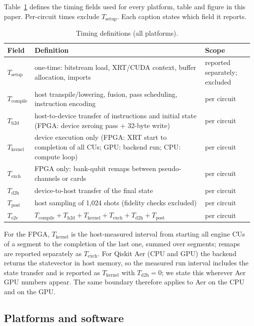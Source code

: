 \documentclass[pdflatex,sn-mathphys-num]{sn-jnl}
\theoremstyle{thmstyleone}
\theoremstyle{thmstylethree}
\begin{document}
Table~\ref{tab:timing} defines the timing fields used for every platform, table and figure in this paper. Per-circuit times exclude $T_\mathrm{setup}$. Each caption states which field it reports.

\begin{table}
\centering
\caption{Timing definitions (all platforms).}\label{tab:timing}
\small
\begin{tabular}{p{1.5cm}p{8.3cm}p{1.8cm}}
\toprule
Field & Definition & Scope \\
\midrule
$T_\mathrm{setup}$ & one-time: bitstream load, XRT/CUDA context, buffer allocation, imports & reported separately; excluded \\
$T_\mathrm{compile}$ & host transpile/lowering, fusion, pass scheduling, instruction encoding & per circuit \\
$T_\mathrm{h2d}$ & host-to-device transfer of instructions and initial state (FPGA: device zeroing pass + 32-byte write) & per circuit \\
$T_\mathrm{kernel}$ & device execution only (FPGA: XRT start to completion of all CUs; GPU: backend run; CPU: compute loop) & per circuit \\
$T_\mathrm{exch}$ & FPGA only: bank-qubit remaps between pseudo-channels or cards & per circuit \\
$T_\mathrm{d2h}$ & device-to-host transfer of the final state & per circuit \\
$T_\mathrm{post}$ & host sampling of 1,024 shots (fidelity checks excluded) & per circuit \\
$T_\mathrm{e2e}$ & $T_\mathrm{compile}+T_\mathrm{h2d}+T_\mathrm{kernel}+T_\mathrm{exch}+T_\mathrm{d2h}+T_\mathrm{post}$ & per circuit \\
\bottomrule
\end{tabular}
\end{table}

For the FPGA, $T_\mathrm{kernel}$ is the host-measured interval from starting all engine CUs of a segment to the completion of the last one, summed over segments; remaps are reported separately as $T_\mathrm{exch}$. For Qiskit Aer (CPU and GPU) the backend returns the statevector in host memory, so the measured run interval includes the state transfer and is reported as $T_\mathrm{kernel}$ with $T_\mathrm{d2h}=0$; we state this wherever Aer GPU numbers appear. The same boundary therefore applies to Aer on the CPU and on the GPU.

\subsection{Platforms and software}\label{subsec:platforms}
\end{document}
